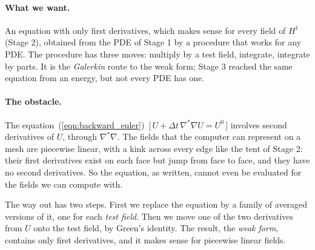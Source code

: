 \paragraph{What we want.} An equation with only first derivatives, which makes sense for every field of $H^1$ (Stage 2), obtained from the PDE of Stage 1 by a procedure that works for any PDE. The procedure has three moves: multiply by a test field, integrate, integrate by parts. It is the \emph{Galerkin} route to the weak form; Stage 3 reached the same equation from an energy, but not every PDE has one.

\paragraph{The obstacle.} The equation~(\ref{eqn:backward_euler})~[\,$U + \Delta t\,\nabla^*\nabla U = U^0$\,] involves second derivatives of $U$, through $\nabla^* \nabla$. The fields that the computer can represent on a mesh are piecewise linear, with a kink across every edge like the tent of Stage 2: their first derivatives exist on each face but jump from face to face, and they have no second derivatives. So the equation, as written, cannot even be evaluated for the fields we can compute with.

The way out has two steps. First we replace the equation by a family of averaged versions of it, one for each \emph{test field}. Then we move one of the two derivatives from $U$ onto the test field, by Green's identity. The result, the \emph{weak form}, contains only first derivatives, and it makes sense for piecewise linear fields.

